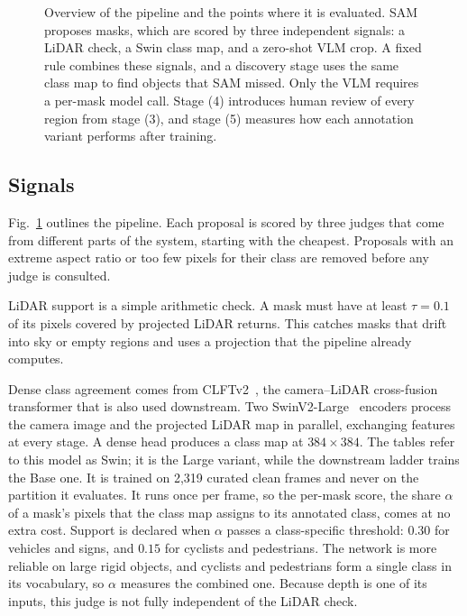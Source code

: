 \documentclass[journal]{IEEEtran}
\begin{document}
\begin{figure}[t]
    \centering
    \resizebox{\columnwidth}{!}{}
\caption{Overview of the pipeline and the points where it is evaluated.
SAM proposes masks, which are scored by three independent signals: a LiDAR check, a Swin class map, and a zero-shot VLM crop.
A fixed rule combines these signals, and a discovery stage uses the same class map to find objects that SAM missed.
Only the VLM requires a per-mask model call.
Stage (4) introduces human review of every region from stage (3), and stage (5) measures how each annotation variant performs after training.}
    \label{fig:architecture}
\end{figure}


\subsection{Signals}

Fig.~\ref{fig:architecture} outlines the pipeline.
Each proposal is scored by three judges that come from different parts of the system, starting with the cheapest. 
Proposals with an extreme aspect ratio or too few pixels for their class are removed before any judge is consulted.

LiDAR support is a simple arithmetic check. 
A mask must have at least $\tau = 0.1$ of its pixels covered by projected LiDAR returns. 
This catches masks that drift into sky or empty regions and uses a projection that the pipeline already computes.

Dense class agreement comes from CLFTv2~\cite{gu2024clft}, the camera--LiDAR cross-fusion transformer that is also used downstream. 
Two SwinV2-Large~\cite{liu2021swin} encoders process the camera image and the projected LiDAR map in parallel, exchanging features at every stage. 
A dense head produces a class map at $384 \times 384$. 
The tables refer to this model as Swin; it is the Large variant, while the downstream ladder trains the Base one. 
It is trained on 2{,}319 curated clean frames and never on the partition it evaluates. 
It runs once per frame, so the per-mask score, the share $\alpha$ of a mask's pixels that the class map assigns to its annotated class, comes at no extra cost. 
Support is declared when $\alpha$ passes a class-specific threshold: $0.30$ for vehicles and signs, and $0.15$ for cyclists and pedestrians. 
The network is more reliable on large rigid objects, and cyclists and pedestrians form a single class in its vocabulary, so $\alpha$ measures the combined one. 
Because depth is one of its inputs, this judge is not fully independent of the LiDAR check.
\end{document}
